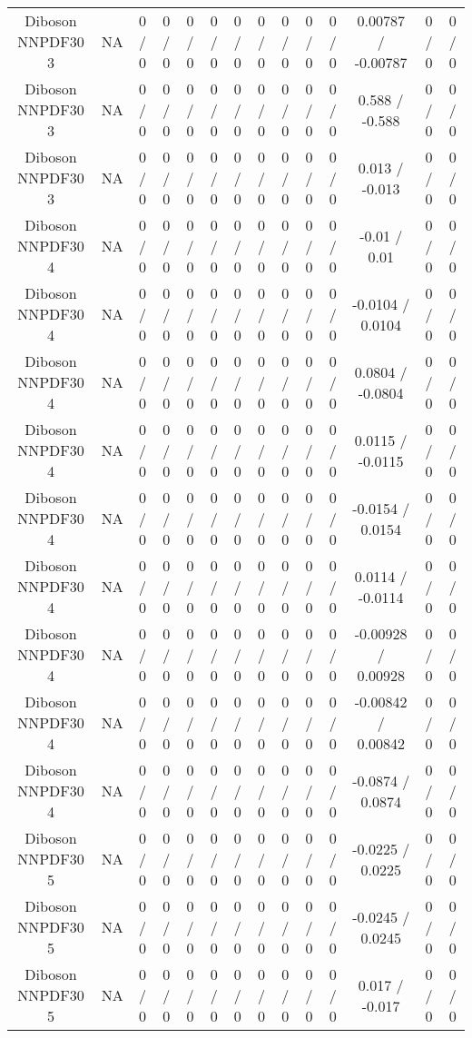\documentclass[10pt]{article}
\begin{document}
\begin{table}[htbp]
\begin{center}
\begin{tabular}{|c|c|c|c|c|c|c|c|c|c|c|c|c|c|}
  Diboson NNPDF30 3 &    NA    & 0 / 0 & 0 / 0 & 0 / 0 & 0 / 0 & 0 / 0 & 0 / 0 & 0 / 0 & 0 / 0 & 0 / 0 & 0.00787 / -0.00787 & 0 / 0 & 0 / 0 \\ 
  Diboson NNPDF30 3 &    NA    & 0 / 0 & 0 / 0 & 0 / 0 & 0 / 0 & 0 / 0 & 0 / 0 & 0 / 0 & 0 / 0 & 0 / 0 & 0.588 / -0.588 & 0 / 0 & 0 / 0 \\ 
  Diboson NNPDF30 3 &    NA    & 0 / 0 & 0 / 0 & 0 / 0 & 0 / 0 & 0 / 0 & 0 / 0 & 0 / 0 & 0 / 0 & 0 / 0 & 0.013 / -0.013 & 0 / 0 & 0 / 0 \\ 
  Diboson NNPDF30 4 &    NA    & 0 / 0 & 0 / 0 & 0 / 0 & 0 / 0 & 0 / 0 & 0 / 0 & 0 / 0 & 0 / 0 & 0 / 0 & -0.01 / 0.01 & 0 / 0 & 0 / 0 \\ 
  Diboson NNPDF30 4 &    NA    & 0 / 0 & 0 / 0 & 0 / 0 & 0 / 0 & 0 / 0 & 0 / 0 & 0 / 0 & 0 / 0 & 0 / 0 & -0.0104 / 0.0104 & 0 / 0 & 0 / 0 \\ 
  Diboson NNPDF30 4 &    NA    & 0 / 0 & 0 / 0 & 0 / 0 & 0 / 0 & 0 / 0 & 0 / 0 & 0 / 0 & 0 / 0 & 0 / 0 & 0.0804 / -0.0804 & 0 / 0 & 0 / 0 \\ 
  Diboson NNPDF30 4 &    NA    & 0 / 0 & 0 / 0 & 0 / 0 & 0 / 0 & 0 / 0 & 0 / 0 & 0 / 0 & 0 / 0 & 0 / 0 & 0.0115 / -0.0115 & 0 / 0 & 0 / 0 \\ 
  Diboson NNPDF30 4 &    NA    & 0 / 0 & 0 / 0 & 0 / 0 & 0 / 0 & 0 / 0 & 0 / 0 & 0 / 0 & 0 / 0 & 0 / 0 & -0.0154 / 0.0154 & 0 / 0 & 0 / 0 \\ 
  Diboson NNPDF30 4 &    NA    & 0 / 0 & 0 / 0 & 0 / 0 & 0 / 0 & 0 / 0 & 0 / 0 & 0 / 0 & 0 / 0 & 0 / 0 & 0.0114 / -0.0114 & 0 / 0 & 0 / 0 \\ 
  Diboson NNPDF30 4 &    NA    & 0 / 0 & 0 / 0 & 0 / 0 & 0 / 0 & 0 / 0 & 0 / 0 & 0 / 0 & 0 / 0 & 0 / 0 & -0.00928 / 0.00928 & 0 / 0 & 0 / 0 \\ 
  Diboson NNPDF30 4 &    NA    & 0 / 0 & 0 / 0 & 0 / 0 & 0 / 0 & 0 / 0 & 0 / 0 & 0 / 0 & 0 / 0 & 0 / 0 & -0.00842 / 0.00842 & 0 / 0 & 0 / 0 \\ 
  Diboson NNPDF30 4 &    NA    & 0 / 0 & 0 / 0 & 0 / 0 & 0 / 0 & 0 / 0 & 0 / 0 & 0 / 0 & 0 / 0 & 0 / 0 & -0.0874 / 0.0874 & 0 / 0 & 0 / 0 \\ 
  Diboson NNPDF30 5 &    NA    & 0 / 0 & 0 / 0 & 0 / 0 & 0 / 0 & 0 / 0 & 0 / 0 & 0 / 0 & 0 / 0 & 0 / 0 & -0.0225 / 0.0225 & 0 / 0 & 0 / 0 \\ 
  Diboson NNPDF30 5 &    NA    & 0 / 0 & 0 / 0 & 0 / 0 & 0 / 0 & 0 / 0 & 0 / 0 & 0 / 0 & 0 / 0 & 0 / 0 & -0.0245 / 0.0245 & 0 / 0 & 0 / 0 \\ 
  Diboson NNPDF30 5 &    NA    & 0 / 0 & 0 / 0 & 0 / 0 & 0 / 0 & 0 / 0 & 0 / 0 & 0 / 0 & 0 / 0 & 0 / 0 & 0.017 / -0.017 & 0 / 0 & 0 / 0 \\ 

\end{tabular}
\end{center}
\end{table}
\end{document}

